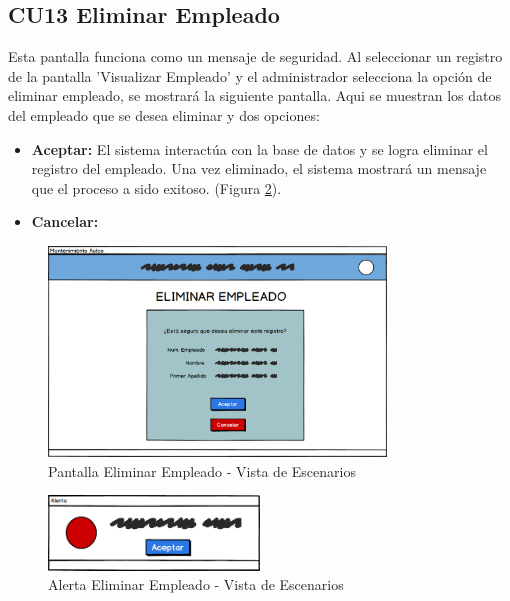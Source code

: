 \subsection{CU13 Eliminar Empleado}
Esta pantalla funciona como un mensaje de seguridad. Al seleccionar un registro de la pantalla 'Visualizar Empleado' y el administrador selecciona la opción de eliminar empleado, se mostrará la siguiente pantalla. Aqui se muestran los datos del empleado que se desea eliminar y dos opciones:
\begin{itemize}
	\item \textbf{Aceptar:} El sistema interactúa con la base de datos y se logra eliminar el registro del empleado. Una vez eliminado, el sistema mostrará un mensaje que el proceso a sido exitoso. (Figura \ref{fig:Alerta Eliminar Empleado - Vista de Escenarios}).
	\item \textbf{Cancelar:} 
\end{itemize}
\begin{figure}[!h]
	\centering
	\includegraphics[width=0.8\textwidth]{./diseno/vescenarios/imagenes/eliminarEmpleado}
	\caption{Pantalla Eliminar Empleado - Vista de Escenarios}
	\label{fig:Pantalla Eliminar Empleado - Vista de Escenarios}
\end{figure}
\begin{figure}[!h]
	\centering
	\includegraphics[width=0.5\textwidth]{./diseno/vescenarios/imagenes/alerta}
	\caption{Alerta Eliminar Empleado - Vista de Escenarios}
	\label{fig:Alerta Eliminar Empleado - Vista de Escenarios}
\end{figure}
\clearpage